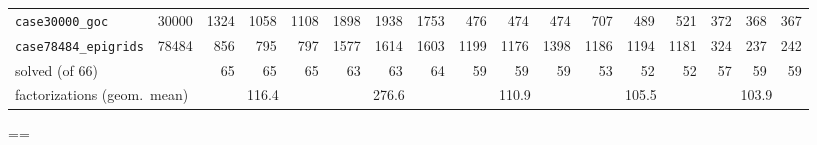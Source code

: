 {\begin{longtable}{lrrrrrrrrrrrrrrrr}
\texttt{case30000\_goc} & 30000 & 1324 & 1058 & 1108 & 1898 & 1938 & 1753 & 476 & 474 & 474 & 707 & 489 & 521 & 372 & 368 & 367 \\
\texttt{case78484\_epigrids} & 78484 & 856 & 795 & 797 & 1577 & 1614 & 1603 & 1199 & 1176 & 1398 & 1186 & 1194 & 1181 & 324 & 237 & 242 \\
\midrule
\multicolumn{2}{l}{solved (of 66)} & 65 & 65 & 65 & 63 & 63 & 64 & 59 & 59 & 59 & 53 & 52 & 52 & 57 & 59 & 59 \\
\multicolumn{2}{l}{factorizations (geom.\ mean)} & \multicolumn{3}{c}{116.4} & \multicolumn{3}{c}{276.6} & \multicolumn{3}{c}{110.9} & \multicolumn{3}{c}{105.5} & \multicolumn{3}{c}{103.9} \\
\end{longtable}}
\clearpage
\pdfpagewidth=\paperwidth \pdfpageheight=\paperheight
\restoregeometry

